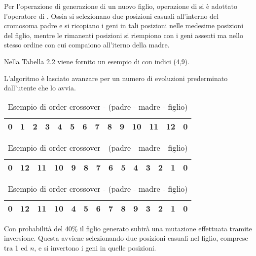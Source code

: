 Per l'operazione di generazione di un nuovo figlio, operazione di  si è adottato l'operatore di . Ossia si selezionano due posizioni casuali all'interno del cromosoma padre e si ricopiano i geni in tali posizioni nelle medesime posizioni del figlio, mentre le rimanenti posizioni si riempiono con i geni assenti ma nello stesso ordine con cui compaiono all'iterno della madre.

Nella Tabella 2.2 viene fornito un esempio di  con indici (4,9).

L'algoritmo è lasciato avanzare per un numero di evoluzioni prederminato dall'utente che lo avvia.

\begin{table}
\centering
\begin{tabular}{|c|c|c|c|c|c|c|c|c|c|c|c|c|c|}
\hline 
0 &  1 &  2 &  3 & 4 & 5 & 6 & 7 & 8 & 9 & 10 & 11 & 12 & 0\\
\hline
\end{tabular}
\begin{tabular}{|c|c|c|c|c|c|c|c|c|c|c|c|c|c|}
\hline
0 & 12 & 11 & 10 & 9 & 8 & 7 & 6 & 5 & 4 &  3 &  2 &  1 & 0\\
\hline
\end{tabular}
\begin{tabular}{|c|c|c|c|c|c|c|c|c|c|c|c|c|c|}
\hline
0 & 12 & 11 & 10 & 4 & 5 & 6 & 7 & 8 & 9 &  3 &  2 &  1 & 0\\
\hline
\end{tabular}
\caption{Esempio di order crossover - (padre - madre - figlio)}
\end{table}

Con probabilità del 40\% il figlio generato subirà una mutazione effettuata tramite inversione. Questa avviene selezionando due posizioni casuali nel figlio, comprese tra 1 ed $n$, e si invertono i geni in quelle posizioni.